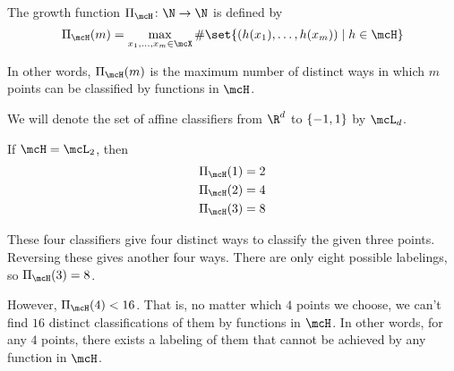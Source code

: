 \begin{definition} \label{def:vc:growth_function}
    The growth function $\Pi_\mcH\colon \N \to \N$ is defined by \[
        \Pi_\mcH(m) = \max_{x_1, \dots, x_m \in \mcX}
            \#\set{(h(x_1), \dots, h(x_m)) \mid h \in \mcH}
    \]
\end{definition}
In other words, $\Pi_\mcH(m)$ is the maximum number of distinct ways
in which $m$ points can be classified by functions in $\mcH$.
\begin{notation}
    We will denote the set of affine classifiers from $\R^d$ to $\{-1, 1\}$
    by $\mcL_d$.
\end{notation}
\begin{example}
    If $\mcH = \mcL_2$, then \begin{align*}
        \Pi_\mcH(1) &= 2 \\
        \Pi_\mcH(2) &= 4 \\
        \Pi_\mcH(3) &= 8
    \end{align*}
    \begin{center}
    \end{center}
    These four classifiers give four distinct ways to classify the given
    three points.
    Reversing these gives another four ways.
    There are only eight possible labelings, so $\Pi_\mcH(3) = 8$.
\end{example}

However, $\Pi_\mcH(4) < 16$.
That is, no matter which $4$ points we choose, we can't find $16$ distinct
classifications of them by functions in $\mcH$.
In other words, for any $4$ points, there exists a labeling of them
that cannot be achieved by any function in $\mcH$.

